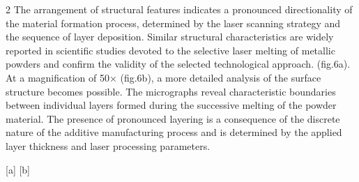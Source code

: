 \begin{multicols}{2}
The arrangement of structural features indicates a pronounced
directionality of the material formation process, determined by the
laser scanning strategy and the sequence of layer deposition. Similar
structural characteristics are widely reported in scientific studies
devoted to the selective laser melting of metallic powders and confirm
the validity of the selected technological approach. (fig.6a). At a
magnification of 50× (fig.6b), a more detailed analysis of the surface
structure becomes possible. The micrographs reveal characteristic
boundaries between individual layers formed during the successive
melting of the powder material. The presence of pronounced layering is a
consequence of the discrete nature of the additive manufacturing process
and is determined by the applied layer thickness and laser processing
parameters.
\end{multicols}

\begin{figs}
    [a]
    [b]
\end{figs}

